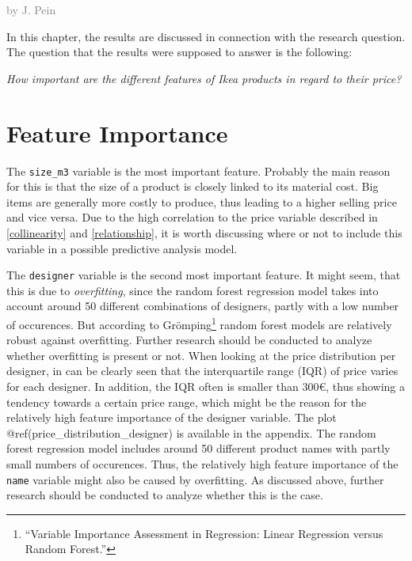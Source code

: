 \documentclass[a4paper, nobind]{templates/ociamthesis}
\begin{document}
\hfill\textcolor{gray}{by J. Pein}

In this chapter, the results are discussed in connection with the research question. The question that the results were supposed to answer is the following:

\emph{How important are the different features of Ikea products in regard to their price?}

\hypertarget{feature-importance-1}{%
\section{Feature Importance}\label{feature-importance-1}}

The \texttt{size\_m3} variable is the most important feature. Probably the main reason for this is that the size of a product is closely linked to its material cost. Big items are generally more costly to produce, thus leading to a higher selling price and vice versa. Due to the high correlation to the price variable described in \ref{collinearity} and \ref{relationship}, it is worth discussing where or not to include this variable in a possible predictive analysis model.

The \texttt{designer} variable is the second most important feature. It might seem, that this is due to \emph{overfitting}, since the random forest regression model takes into account around 50 different combinations of designers, partly with a low number of occurences. But according to Grömping\footnote{``Variable Importance Assessment in Regression: Linear Regression versus Random Forest.''} random forest models are relatively robust against overfitting. Further research should be conducted to analyze whether overfitting is present or not.
When looking at the price distribution per designer, in can be clearly seen that the interquartile range (IQR) of price varies for each designer. In addition, the IQR often is smaller than 300€, thus showing a tendency towards a certain price range, which might be the reason for the relatively high feature importance of the designer variable. The plot @ref(price\_distribution\_designer) is available in the appendix.
The random forest regression model includes around 50 different product names with partly small numbers of occurences. Thus, the relatively high feature importance of the \texttt{name} variable might also be caused by overfitting. As discussed above, further research should be conducted to analyze whether this is the case.
\end{document}

